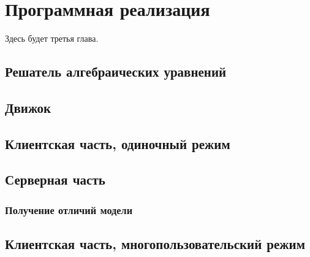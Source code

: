 \chapter{Программная реализация}

Здесь будет третья глава. \TODO

\section{Решатель алгебраических уравнений}

\TODO

\section{Движок}\label{engine}

\TODO

\section{Клиентская часть, одиночный режим}

\TODO

\section{Серверная часть}

\subsection{Получение отличий модели}\label{model-diff-implementation}

\TODO

\section{Клиентская часть, многопользовательский режим}

\TODO
